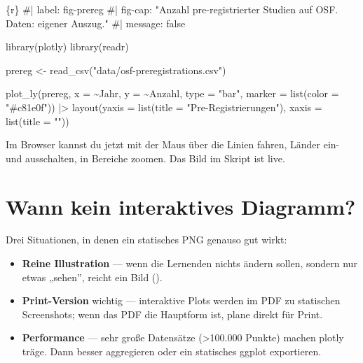 \documentclass[
  ngerman,
  a4paper,
  DIV=11]{scrreprt}
\newenvironment{Shaded}{\begin{snugshade}}{\end{snugshade}}
\newcommand{\AttributeTok}[1]{\textcolor[rgb]{0.40,0.45,0.13}{#1}}
\newcommand{\CommentTok}[1]{\textcolor[rgb]{0.37,0.37,0.37}{#1}}
\newcommand{\FunctionTok}[1]{\textcolor[rgb]{0.28,0.35,0.67}{#1}}
\newcommand{\InformationTok}[1]{\textcolor[rgb]{0.37,0.37,0.37}{#1}}
\newcommand{\NormalTok}[1]{\textcolor[rgb]{0.00,0.23,0.31}{#1}}
\newcommand{\OtherTok}[1]{\textcolor[rgb]{0.00,0.23,0.31}{#1}}
\newcommand{\SpecialCharTok}[1]{\textcolor[rgb]{0.37,0.37,0.37}{#1}}
\newcommand{\StringTok}[1]{\textcolor[rgb]{0.13,0.47,0.30}{#1}}
\providecommand{\tightlist}{%
  \setlength{\itemsep}{0pt}\setlength{\parskip}{0pt}}
\begin{document}
\begin{Shaded}
\begin{Highlighting}[]
\InformationTok{\textasciigrave{}\textasciigrave{}\textasciigrave{}\{r\}}
\CommentTok{\#| label: fig{-}prereg}
\CommentTok{\#| fig{-}cap: "Anzahl pre{-}registrierter Studien auf OSF. Daten: eigener Auszug."}
\CommentTok{\#| message: false}

\FunctionTok{library}\NormalTok{(plotly)}
\FunctionTok{library}\NormalTok{(readr)}

\NormalTok{prereg }\OtherTok{\textless{}{-}} \FunctionTok{read\_csv}\NormalTok{(}\StringTok{"data/osf{-}preregistrations.csv"}\NormalTok{)}

\FunctionTok{plot\_ly}\NormalTok{(prereg, }\AttributeTok{x =} \SpecialCharTok{\textasciitilde{}}\NormalTok{Jahr, }\AttributeTok{y =} \SpecialCharTok{\textasciitilde{}}\NormalTok{Anzahl, }\AttributeTok{type =} \StringTok{"bar"}\NormalTok{,}
        \AttributeTok{marker =} \FunctionTok{list}\NormalTok{(}\AttributeTok{color =} \StringTok{"\#c81e0f"}\NormalTok{)) }\SpecialCharTok{|\textgreater{}}
  \FunctionTok{layout}\NormalTok{(}\AttributeTok{yaxis =} \FunctionTok{list}\NormalTok{(}\AttributeTok{title =} \StringTok{"Pre{-}Registrierungen"}\NormalTok{),}
         \AttributeTok{xaxis =} \FunctionTok{list}\NormalTok{(}\AttributeTok{title =} \StringTok{""}\NormalTok{))}
\InformationTok{\textasciigrave{}\textasciigrave{}\textasciigrave{}}
\end{Highlighting}
\end{Shaded}

Im Browser kannst du jetzt mit der Maus über die Linien fahren, Länder
ein- und ausschalten, in Bereiche zoomen. Das Bild im Skript ist live.

\section{\texorpdfstring{Wann \textbf{kein} interaktives
Diagramm?}{Wann kein interaktives Diagramm?}}\label{wann-kein-interaktives-diagramm}

Drei Situationen, in denen ein statisches PNG genauso gut wirkt:

\begin{itemize}
\tightlist
\item
  \textbf{Reine Illustration} --- wenn die Lernenden nichts ändern
  sollen, sondern nur etwas „sehen'', reicht ein Bild
  ().
\item
  \textbf{Print-Version} wichtig --- interaktive Plots werden im PDF zu
  statischen Screenshots; wenn das PDF die Hauptform ist, plane direkt
  für Print.
\item
  \textbf{Performance} --- sehr große Datensätze (\textgreater100.000
  Punkte) machen plotly träge. Dann besser aggregieren oder ein
  statisches ggplot exportieren.
\end{itemize}
\end{document}
